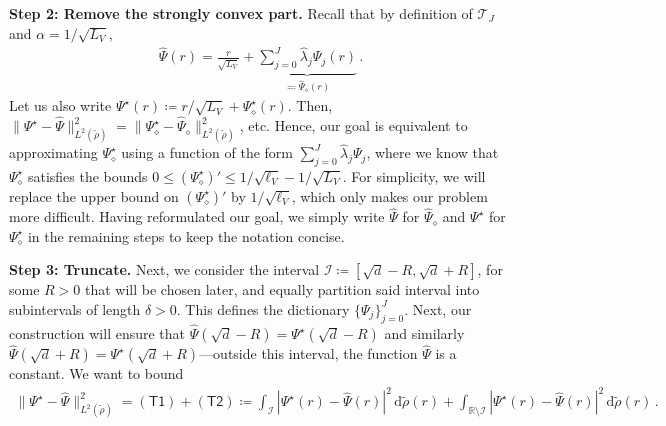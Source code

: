\documentclass[twoside]{article}
\newcommand{\cI}{\mathcal{I}}
\newcommand{\cT}{\mathcal{T}}
\newcommand{\1}{\mathds{1}}
\newcommand{\R}{\mathbb{R}}
\newcommand*{\defeq}{\coloneqq}
\newcommand*{\rd}{\mathrm{d}}
\newcommand*{\dd}{\, \rd}
\theoremstyle{plain}
\theoremstyle{definition}
\theoremstyle{remark}
\renewcommand{\tilde}{\widetilde}
\begin{document}
\textbf{Step 2: Remove the strongly convex part.}
Recall that by definition of $\cT_J$ and $\alpha = 1/\sqrt{L_V}$,
\begin{align*}
    \hat\Psi(r) = \frac{r}{\sqrt{L_V}} + \underbrace{\sum_{j=0}^J \hat\lambda_j \Psi_j(r)}_{\eqqcolon \hat\Psi_\diamond(r)}\,.
\end{align*}
Let us also write $\Psi^\star(r) \defeq r/\sqrt{L_V} + \Psi^\star_\diamond(r)$.
Then, $\|\Psi^\star - \hat\Psi\|_{L^2(\tilde\rho)}^2 = \|\Psi^\star_\diamond - \hat\Psi_\diamond\|_{L^2(\tilde\rho)}^2$, etc.
Hence, our goal is equivalent to approximating $\Psi_\diamond^\star$ using a function of the form $\sum_{j=0}^J \hat\lambda_j \Psi_j$, where we know that $\Psi^\star_\diamond$ satisfies the bounds $0 \le (\Psi_\diamond^\star)' \le 1/\sqrt{\ell_V} - 1/\sqrt{L_V}$.
For simplicity, we will replace the upper bound on $(\Psi^\star_\diamond)'$ by $1/\sqrt{\ell_V}$, which only makes our problem more difficult.
Having reformulated our goal, we simply write $\hat\Psi$ for $\hat\Psi_\diamond$ and $\Psi^\star$ for $\Psi^\star_\diamond$ in the remaining steps to keep the notation concise.

\textbf{Step 3: Truncate.}
Next, we consider the interval $\cI \defeq [\sqrt{d}-R, \sqrt{d} + R]$, for some $R > 0$ that will be chosen later, and equally partition said interval into subintervals of length $\delta>0$. This defines the dictionary $\{\Psi_j\}_{j=0}^J$. Next, our construction will ensure that $\hat{\Psi}(\sqrt{d}-R) = \Psi^\star(\sqrt{d}-R)$ and similarly $\hat{\Psi}(\sqrt{d}+R) = \Psi^\star(\sqrt{d}+R)$---outside this interval, the function $\hat\Psi$ is a constant.
We want to bound
\begin{align*}
    \|\Psi^\star - \hat\Psi\|^2_{L^2(\tilde\rho)}  = (\mathsf{T1}) + (\mathsf{T2})
    \defeq \int_{\cI} |\Psi^\star(r) - \hat\Psi(r)|^2 \dd \tilde\rho(r) + \int_{\R \setminus \cI} |\Psi^\star(r) - \hat\Psi(r)|^2 \dd \tilde\rho(r)\,.
\end{align*}
\end{document}
